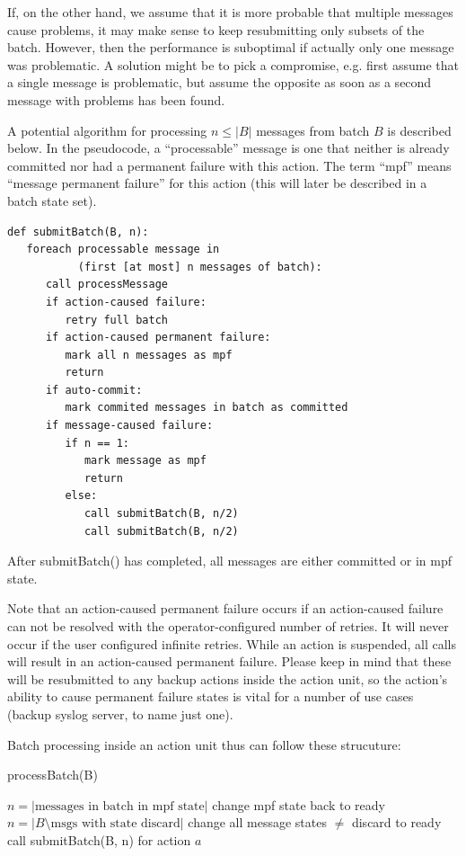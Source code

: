 \documentclass[a4paper,10pt]{article}
\begin{document}
If, on the other hand, we assume that it is more probable that multiple messages cause problems, it may make sense to keep resubmitting only subsets of the batch. However, then the performance is suboptimal if actually only one message was problematic. A solution might be to pick a compromise, e.g. first assume that a single message is problematic, but assume the opposite as soon as a second message with problems has been found.

A potential algorithm for processing $n \le |B|$ messages from batch $B$ is described below. In the pseudocode, a ``processable'' message is one that neither is already committed nor had a permanent failure with this action. The term ``mpf'' means ``message permanent failure'' for this action (this will later be described in a batch state set).

\begin{small}
\lstset{language=python}
\begin{lstlisting}
def submitBatch(B, n):
   foreach processable message in 
           (first [at most] n messages of batch):
      call processMessage
      if action-caused failure:
         retry full batch
      if action-caused permanent failure:
         mark all n messages as mpf
         return
      if auto-commit:
         mark commited messages in batch as committed
      if message-caused failure:
         if n == 1:
            mark message as mpf
            return
         else:
            call submitBatch(B, n/2)
            call submitBatch(B, n/2)
\end{lstlisting}
\end{small}

After submitBatch() has completed, all messages are either committed or in mpf state.

Note that an action-caused permanent failure occurs if an action-caused failure can not be resolved with the operator-configured number of retries. It will never occur if the user configured infinite retries. While an action is suspended, all calls will result in an action-caused permanent failure. Please keep in mind that these will be resubmitted to any backup actions inside the action unit, so the action's ability to cause permanent failure states is vital for a number of use cases (backup syslog server, to name just one).

Batch processing inside an action unit thus can follow these strucuture:

\begin{algorithm}
\caption{processBatch(B)}
\begin{algorithmic}
		\STATE $n = |\text{messages in batch in mpf state}|$
		\STATE change mpf state back to ready
	\ELSE
		\STATE $n = |B \setminus \text{msgs with state discard}|$
		\STATE change all message states $\ne$ discard to ready 
	\ENDIF
		\STATE call submitBatch(B, n) for action $a$
	\ENDIF
\ENDFOR
\end{algorithmic}
\end{algorithm}
\end{document}

